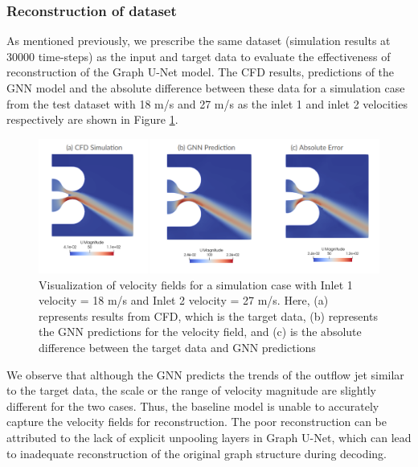 \subsubsection{Reconstruction of dataset}
As mentioned previously, we prescribe the same dataset (simulation results at 30000 time-steps) as the input and target data to evaluate the effectiveness of reconstruction of the Graph U-Net model. The CFD results, predictions of the GNN model and the absolute difference between these data for a simulation case from the test dataset with 18 m/s and 27 m/s as the inlet 1 and inlet 2 velocities respectively are shown in Figure \ref{blrecon}.
\begin{figure}[ht]
    \centering
    \includegraphics[width=14cm]{images/Methodology/Baselinereconstruct.png}
    \caption{Visualization of velocity fields for a simulation case with Inlet 1 velocity = 18 m/s and Inlet 2 velocity = 27 m/s. Here, (a) represents results from CFD, which is the target data, (b) represents the GNN predictions for the velocity field, and (c) is the absolute difference between the target data and GNN predictions} 
    \label{blrecon}
\end{figure}
We observe that although the GNN predicts the trends of the outflow jet similar to the target data, the scale or the range of velocity magnitude are slightly different for the two cases. Thus, the baseline model is unable to accurately capture the velocity fields for reconstruction. The poor reconstruction can be attributed to the lack of explicit unpooling layers in Graph U-Net, which can lead to inadequate reconstruction of the original graph structure during decoding. 
